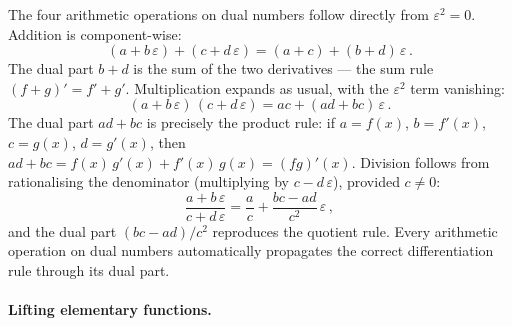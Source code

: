 The four arithmetic operations on dual numbers follow
directly from $\varepsilon^2 = 0$.  Addition is
component-wise:
%
\begin{equation}
  (a + b\,\varepsilon) + (c + d\,\varepsilon)
    = (a + c) + (b + d)\,\varepsilon \,.
  \label{eq:dual-add}
\end{equation}
%
The dual part $b + d$ is the sum of the two derivatives ---
the sum rule $(f + g)' = f' + g'$.
Multiplication expands as usual, with the $\varepsilon^2$
term vanishing:
%
\begin{equation}
  (a + b\,\varepsilon)\,(c + d\,\varepsilon)
    = ac + (ad + bc)\,\varepsilon \,.
  \label{eq:dual-mul}
\end{equation}
%
The dual part $ad + bc$ is precisely the product rule:
if $a = f(x)$, $b = f'(x)$, $c = g(x)$, $d = g'(x)$, then
$ad + bc = f(x)\,g'(x) + f'(x)\,g(x) = (fg)'(x)$.
Division follows from rationalising the denominator
(multiplying by $c - d\,\varepsilon$), provided $c \neq 0$:
%
\begin{equation}
  \frac{a + b\,\varepsilon}{c + d\,\varepsilon}
    = \frac{a}{c} + \frac{bc - ad}{c^2}\,\varepsilon \,,
  \label{eq:dual-div}
\end{equation}
%
and the dual part $(bc - ad)/c^2$ reproduces the quotient
rule.  Every arithmetic operation on dual numbers
automatically propagates the correct differentiation rule
through its dual part.

\paragraph{Lifting elementary functions.}

